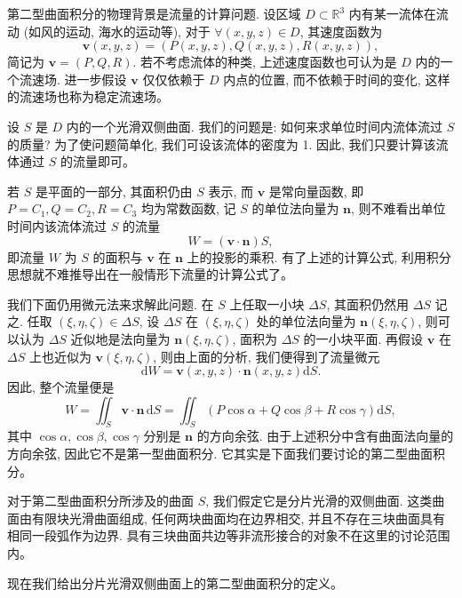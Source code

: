 \documentclass[UTF8,12pt,a4paper,fontset=fandol]{ctexart}
\begin{document}
第二型曲面积分的物理背景是流量的计算问题. 设区域 $D\subset\mathbb R^3$ 内有某一流体在流动 (如风的运动, 海水的运动等), 对于 $\forall(x,y,z)\in D$, 其速度函数为
\[
  \boldsymbol v(x,y,z)=(P(x,y,z),Q(x,y,z),R(x,y,z)),
\]
简记为 $\boldsymbol v=(P,Q,R)$. 若不考虑流体的种类, 上述速度函数也可认为是 $D$ 内的一个流速场. 进一步假设 $\boldsymbol v$ 仅仅依赖于 $D$ 内点的位置, 而不依赖于时间的变化, 这样的流速场也称为稳定流速场。

设 $S$ 是 $D$ 内的一个光滑双侧曲面. 我们的问题是: 如何来求单位时间内流体流过 $S$ 的质量? 为了使问题简单化, 我们可设该流体的密度为 1. 因此, 我们只要计算该流体通过 $S$ 的流量即可。

若 $S$ 是平面的一部分, 其面积仍由 $S$ 表示, 而 $\boldsymbol v$ 是常向量函数, 即 $P=C_1,Q=C_2,R=C_3$ 均为常数函数, 记 $S$ 的单位法向量为 $\boldsymbol n$, 则不难看出单位时间内该流体流过 $S$ 的流量
\[
  W=(\boldsymbol v\cdot\boldsymbol n)S,
\]
即流量 $W$ 为 $S$ 的面积与 $\boldsymbol v$ 在 $\boldsymbol n$ 上的投影的乘积. 有了上述的计算公式, 利用积分思想就不难推导出在一般情形下流量的计算公式了。

我们下面仍用微元法来求解此问题. 在 $S$ 上任取一小块 $\Delta S$, 其面积仍然用 $\Delta S$ 记之. 任取 $(\xi,\eta,\zeta)\in\Delta S$, 设 $\Delta S$ 在 $(\xi,\eta,\zeta)$ 处的单位法向量为 $\boldsymbol n(\xi,\eta,\zeta)$, 则可以认为 $\Delta S$ 近似地是法向量为 $\boldsymbol n(\xi,\eta,\zeta)$, 面积为 $\Delta S$ 的一小块平面. 再假设 $\boldsymbol v$ 在 $\Delta S$ 上也近似为 $\boldsymbol v(\xi,\eta,\zeta)$, 则由上面的分析, 我们便得到了流量微元
\[
  \mathrm dW=\boldsymbol v(x,y,z)\cdot\boldsymbol n(x,y,z)\mathrm dS.
\]
因此, 整个流量便是
\[
  W=\iint_S\boldsymbol v\cdot\boldsymbol n\,\mathrm dS
  =\iint_S(P\cos\alpha+Q\cos\beta+R\cos\gamma)\mathrm dS,
\]
其中 $\cos\alpha,\cos\beta,\cos\gamma$ 分别是 $\boldsymbol n$ 的方向余弦. 由于上述积分中含有曲面法向量的方向余弦, 因此它不是第一型曲面积分. 它其实是下面我们要讨论的第二型曲面积分。

对于第二型曲面积分所涉及的曲面 $S$, 我们假定它是分片光滑的双侧曲面. 这类曲面由有限块光滑曲面组成, 任何两块曲面均在边界相交, 并且不存在三块曲面具有相同一段弧作为边界. 具有三块曲面共边等非流形接合的对象不在这里的讨论范围内。

现在我们给出分片光滑双侧曲面上的第二型曲面积分的定义。
\end{document}
